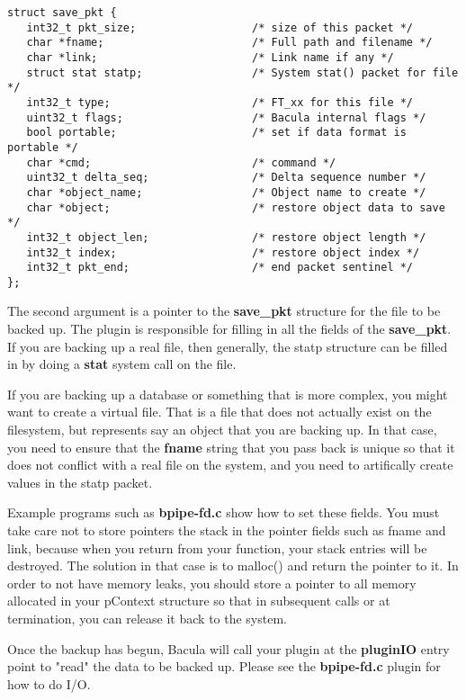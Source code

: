 \begin{verbatim}
struct save_pkt {
   int32_t pkt_size;                  /* size of this packet */
   char *fname;                       /* Full path and filename */
   char *link;                        /* Link name if any */
   struct stat statp;                 /* System stat() packet for file */
   int32_t type;                      /* FT_xx for this file */
   uint32_t flags;                    /* Bacula internal flags */
   bool portable;                     /* set if data format is portable */
   char *cmd;                         /* command */
   uint32_t delta_seq;                /* Delta sequence number */
   char *object_name;                 /* Object name to create */
   char *object;                      /* restore object data to save */
   int32_t object_len;                /* restore object length */
   int32_t index;                     /* restore object index */
   int32_t pkt_end;                   /* end packet sentinel */
};
\end{verbatim}

The second argument is a pointer to the {\bf save\_pkt} structure for the file
to be backed up.  The plugin is responsible for filling in all the fields
of the {\bf save\_pkt}. If you are backing up
a real file, then generally, the statp structure can be filled in by doing
a {\bf stat} system call on the file.

If you are backing up a database or
something that is more complex, you might want to create a virtual file.
That is a file that does not actually exist on the filesystem, but represents
say an object that you are backing up.  In that case, you need to ensure
that the {\bf fname} string that you pass back is unique so that it
does not conflict with a real file on the system, and you need to
artifically create values in the statp packet.

Example programs such as {\bf bpipe-fd.c} show how to set these fields.  You
must take care not to store pointers the stack in the pointer fields such as
fname and link, because when you return from your function, your stack entries
will be destroyed. The solution in that case is to malloc() and return the
pointer to it. In order to not have memory leaks, you should store a pointer to
all memory allocated in your pContext structure so that in subsequent calls or
at termination, you can release it back to the system.

Once the backup has begun, Bacula will call your plugin at the {\bf pluginIO}
entry point to "read" the data to be backed up.  Please see the {\bf bpipe-fd.c}
plugin for how to do I/O.

